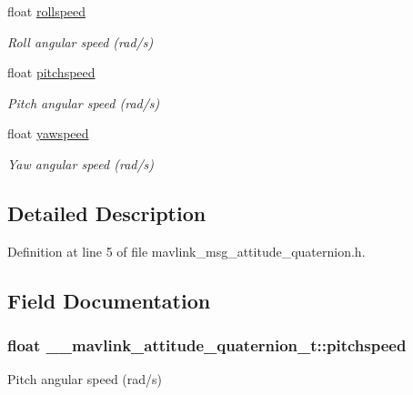 \begin{DoxyCompactItemize}
float \hyperlink{struct____mavlink__attitude__quaternion__t_aa6ec530191df4da1f482533321684902}{rollspeed}
\begin{DoxyCompactList}\small\item\em Roll angular speed (rad/s) \end{DoxyCompactList}\item 
float \hyperlink{struct____mavlink__attitude__quaternion__t_ac77cd2999fca4230bf4fe7bcfe67c434}{pitchspeed}
\begin{DoxyCompactList}\small\item\em Pitch angular speed (rad/s) \end{DoxyCompactList}\item 
float \hyperlink{struct____mavlink__attitude__quaternion__t_a6e76b94100205e6f58df4232c1b4c32e}{yawspeed}
\begin{DoxyCompactList}\small\item\em Yaw angular speed (rad/s) \end{DoxyCompactList}\end{DoxyCompactItemize}


\subsection{Detailed Description}


Definition at line 5 of file mavlink\-\_\-msg\-\_\-attitude\-\_\-quaternion.\-h.



\subsection{Field Documentation}
\hypertarget{struct____mavlink__attitude__quaternion__t_ac77cd2999fca4230bf4fe7bcfe67c434}{
\subsubsection[{pitchspeed}]{\setlength{\rightskip}{0pt plus 5cm}float \-\_\-\-\_\-mavlink\-\_\-attitude\-\_\-quaternion\-\_\-t\-::pitchspeed}}\label{struct____mavlink__attitude__quaternion__t_ac77cd2999fca4230bf4fe7bcfe67c434}


Pitch angular speed (rad/s) 




